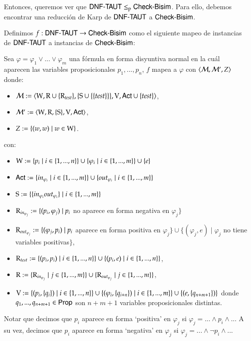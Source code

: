 Entonces, queremos ver que $\DNFTAUT \leq_p \CBisim$. Para ello, debemos encontrar una reducción de Karp de $\DNFTAUT$ a $\CBisim$.

\begin{definicion}\label{def:karp-reduction}
    Definimos $f : \DNFTAUT \rightarrow \CBisim$ como el siguiente mapeo de instancias de $\DNFTAUT$ a instancias de $\CBisim$:

    Sea $\varphi = \varphi_1 \vee ... \vee \varphi_m$ una fórmula en forma disyuntiva normal en la cuál aparecen las variables 
    proposicionales $p_1,...,p_n$, $f$ mapea a $\varphi$ con $\tup{\model,\model',Z}$ donde:
    \begin{itemize}
        \item $\model := \tup{\W, \R \cup \{\R_{test}\}, \{\S \cup \{\{test\}\}\}, \V, \ACT \cup \{test\}}$,
        \item $\model' := \tup{\W, \R, \{\S\}, \V, \ACT}$,
        \item $Z := \{(w,w) \mid w \in \W\}$.
    \end{itemize}
    con:
    \begin{itemize}
        \item $\W := \{p_i\mid i\in\{1,...,n\}\} \cup \{\varphi_i \mid i \in \{1,...,m\}\} \cup \{e\}$
        \item $\ACT := \{in_{\varphi_i} \mid i \in \{1,...,m\}\} \cup \{out_{\varphi_i} \mid i \in \{1,...,m\}\}$
        \item $\S := \{\{in_{\varphi_i}out_{\varphi_i}\} \mid i \in \{1,...,m\}\}$
        \item $\R_{in_{\varphi_j}} := \{(p_i,\varphi_j) \mid p_i$ no aparece en forma negativa en $\varphi_j\}$
        \item $\R_{out_{\varphi_j}} := \{(\varphi_j,p_i) \mid p_i$ aparece en forma positiva en $\varphi_j\} \cup \{(\varphi_j,e) \mid \varphi_j$ no tiene variables positivas$\}$,        
        \item $\R_{test} := \{(p_i,p_i) \mid i \in \{1,...,n\}\} \cup \{(p_i,e)\mid i\in \{1,...,n\}\}$,
        \item $\R := \{\R_{in_{\varphi_j}}\mid j \in \{1,...,m\}\} \cup \{\R_{out_{\varphi_j}}\mid j \in \{1,...,m\}\}$,
        \item $\V := \{(p_i,\{q_i\}) \mid i \in \{1,...,n\}\} \cup 
                     \{(\varphi_i,\{q_{i+n}\}) \mid i \in \{1,...,m\}\} \cup 
                     \{(e,\{q_{n+m+1}\})\}$ donde $q_1,...,q_{n+m+1} \in \PROP$ son $n+m+1$ variables proposicionales distintas.
    \end{itemize}
    Notar que decimos que $p_i$ aparece en forma `positiva' en $\varphi_j$ si $\varphi_j = ... \wedge p_i \wedge...$
    A su vez, decimos que $p_i$ aparece en forma `negativa' en $\varphi_j$ si $\varphi_j = ...\wedge \neg p_i \wedge...$


\end{definicion}

